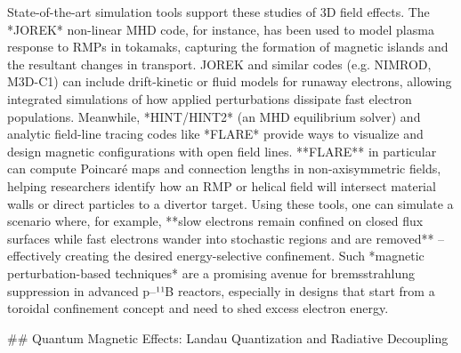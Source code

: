 \documentclass[12pt]{article}
\begin{document}
{State-of-the-art simulation tools support these studies of 3D field effects. The *JOREK* non-linear MHD code, for instance, has been used to model plasma response to RMPs in tokamaks, capturing the formation of magnetic islands and the resultant changes in transport. JOREK and similar codes (e.g. NIMROD, M3D-C1) can include drift-kinetic or fluid models for runaway electrons, allowing integrated simulations of how applied perturbations dissipate fast electron populations. Meanwhile, *HINT/HINT2* (an MHD equilibrium solver) and analytic field-line tracing codes like *FLARE* provide ways to visualize and design magnetic configurations with open field lines. **FLARE** in particular can compute Poincaré maps and connection lengths in non-axisymmetric fields, helping researchers identify how an RMP or helical field will intersect material walls or direct particles to a divertor target. Using these tools, one can simulate a scenario where, for example, **slow electrons remain confined on closed flux surfaces while fast electrons wander into stochastic regions and are removed** – effectively creating the desired energy-selective confinement. Such *magnetic perturbation-based techniques* are a promising avenue for bremsstrahlung suppression in advanced p–¹¹B reactors, especially in designs that start from a toroidal confinement concept and need to shed excess electron energy.

## Quantum Magnetic Effects: Landau Quantization and Radiative Decoupling

}
\end{document}

